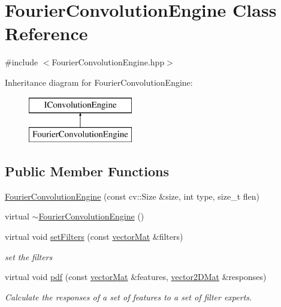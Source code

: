 \hypertarget{classFourierConvolutionEngine}{\section{Fourier\-Convolution\-Engine Class Reference}
\label{classFourierConvolutionEngine}
}


{\ttfamily \#include $<$Fourier\-Convolution\-Engine.\-hpp$>$}

Inheritance diagram for Fourier\-Convolution\-Engine\-:\begin{figure}[H]
\begin{center}
\leavevmode
\includegraphics[height=2.000000cm]{classFourierConvolutionEngine}
\end{center}
\end{figure}
\subsection*{Public Member Functions}
\begin{DoxyCompactItemize}
\item 
\hyperlink{classFourierConvolutionEngine_a30d60a44b5767b43a4042171cf813fcd}{Fourier\-Convolution\-Engine} (const cv\-::\-Size \&size, int type, size\-\_\-t flen)
\item 
virtual \hyperlink{classFourierConvolutionEngine_a827dafdecfbb07891fbeee998af60236}{$\sim$\-Fourier\-Convolution\-Engine} ()
\item 
virtual void \hyperlink{classFourierConvolutionEngine_ad895979797d38a7c97e8dfcca9571fd2}{set\-Filters} (const \hyperlink{types_8hpp_a3207a7addcfa415d1c83622febcb1e9b}{vector\-Mat} \&filters)
\begin{DoxyCompactList}\small\item\em set the filters \end{DoxyCompactList}\item 
virtual void \hyperlink{classFourierConvolutionEngine_a30e84c8f67a198d318780e247efbbe41}{pdf} (const \hyperlink{types_8hpp_a3207a7addcfa415d1c83622febcb1e9b}{vector\-Mat} \&features, \hyperlink{types_8hpp_a33cacb85be7b8df3dc0b67d5d849f4cc}{vector2\-D\-Mat} \&responses)
\begin{DoxyCompactList}\small\item\em Calculate the responses of a set of features to a set of filter experts. \end{DoxyCompactList}\end{DoxyCompactItemize}
